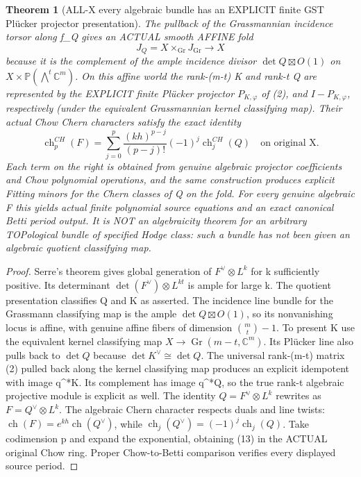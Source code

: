 \documentclass[11pt]{article}
\newtheorem{theorem}{Theorem}[section]
\begin{document}
\begin{theorem}[ALL-X every algebraic bundle has an EXPLICIT finite GST Pl\"ucker projector presentation]
The pullback of the
Grassmannian incidence
torsor along f_Q gives
an ACTUAL smooth
AFFINE fold
\[
 J_Q=X\times_{\operatorname{Gr}}
     J_{\operatorname{Gr}}
       \longrightarrow X
\]
because it is the
complement of the ample
incidence divisor
$\det Q\boxtimes O(1)$
on $X\times\mathbb P
(\bigwedge^t\mathbb C^m)$.
On this affine world
the rank-(m-t) K and
rank-t Q are represented
by the EXPLICIT
finite Pl\"ucker
projector $P_{K,\varphi}$
of (2), and $I-P_{K,\varphi}$,
respectively (under the
equivalent Grassmannian
kernel classifying map).
Their actual Chow
Chern characters satisfy
the exact identity
\[
 \boxed{
 \operatorname{ch}_p^{CH}(F)=
 \sum_{j=0}^p
    \frac{(kh)^{p-j}}{(p-j)!}
       (-1)^j
       \operatorname{ch}_j^{CH}(Q)
 \quad\text{on original X.}
 }                                                     \tag{13}
\]
Each term on the right
is obtained from genuine
algebraic projector
coefficients and Chow
polynomial operations,
and the same construction
produces explicit Fitting
minors for the Chern
classes of Q on the fold.
For every genuine algebraic
F this yields actual
finite polynomial
source equations and
an exact canonical
Betti period output.
It is NOT an algebraicity
theorem for an arbitrary
TOPological bundle
of specified Hodge class:
such a bundle has not
been given an algebraic
quotient classifying map.
\end{theorem}
\begin{proof}
Serre's theorem gives
global generation of
$F^\vee\otimes L^k$ for
k sufficiently positive.
Its determinant
$\det(F^\vee)\otimes
L^{kt}$ is ample for
large k. The quotient
presentation classifies
Q and K as asserted.
The incidence line bundle
for the Grassmann
classifying map is
the ample
$\det Q\boxtimes O(1)$,
so its nonvanishing
locus is affine,
with genuine affine
fibers of dimension
$\binom mt-1$.
To present K use the
equivalent kernel
classifying map
$X\to\operatorname{Gr}
(m-t,\mathbb C^m)$.
Its Pl\"ucker line
also pulls back to
$\det Q$ because
$\det K^\vee\cong\det Q$.
The universal rank-(m-t)
matrix (2) pulled back
along the kernel
classifying map produces
an explicit idempotent
with image q^*K.
Its complement has
image q^*Q, so the
true rank-t algebraic
projective module is
explicit as well.
The identity
$Q=F^\vee\otimes L^k$
rewrites as
$F=Q^\vee\otimes L^k$.
The algebraic Chern
character respects
duals and line twists:
$\operatorname{ch}(F)
=e^{kh}\operatorname{ch}
(Q^\vee)$, while
$\operatorname{ch}_j(Q^\vee)
=(-1)^j\operatorname{ch}_j(Q)$.
Take codimension p and
expand the exponential,
obtaining (13) in the
ACTUAL original Chow
ring. Proper Chow-to-Betti
comparison verifies every
displayed source period.
\end{proof}
\end{document}
